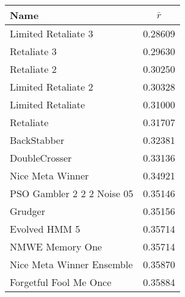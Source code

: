\begin{tabular}{lc}
\toprule
Name                       &          \(\bar{r}\)\\
\midrule
Limited Retaliate 3        &          0.28609 \\
Retaliate 3                &          0.29630 \\
Retaliate 2                &          0.30250 \\
Limited Retaliate 2        &          0.30328 \\
Limited Retaliate          &          0.31000 \\
Retaliate                  &          0.31707 \\
BackStabber                &          0.32381 \\
DoubleCrosser              &          0.33136 \\
Nice Meta Winner           &          0.34921 \\
PSO Gambler 2 2 2 Noise 05 &          0.35146 \\
Grudger                    &          0.35156 \\
Evolved HMM 5              &          0.35714 \\
NMWE Memory One            &          0.35714 \\
Nice Meta Winner Ensemble  &          0.35870 \\
Forgetful Fool Me Once     &          0.35884 \\
\bottomrule
\end{tabular}
